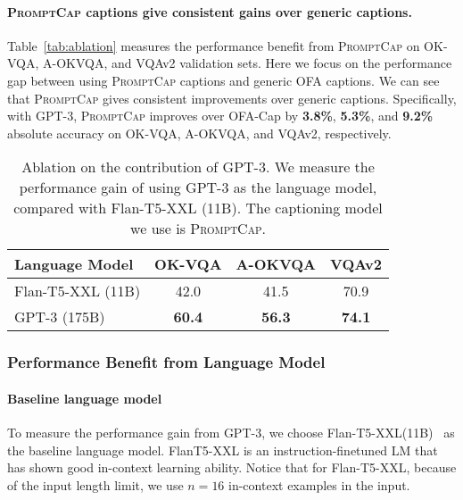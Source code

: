 \documentclass[10pt,twocolumn,letterpaper]{article}
\newcommand{\NAME}{\textsc{PromptCap}\xspace}
\begin{document}
\vspace{-0.1in}
\paragraph{\NAME captions give consistent gains over generic captions.}Table~\ref{tab:ablation} measures the performance benefit from \NAME on OK-VQA, A-OKVQA, and VQAv2 validation sets.
Here we focus on the performance gap between using \NAME captions and generic OFA captions.
We can see that \NAME gives consistent improvements over generic captions. 
Specifically, with GPT-3, \NAME improves over OFA-Cap by \textbf{3.8\%}, \textbf{5.3\%}, and \textbf{9.2\%} absolute accuracy on OK-VQA, A-OKVQA, and VQAv2, respectively.


\begin{table}[th]
\small
\centering
\caption{
Ablation on the contribution of GPT-3. We measure the performance gain of using GPT-3 as the language model, compared with Flan-T5-XXL (11B).
The captioning model we use is \NAME.
}
\begin{tabular}{l|ccc}
\toprule[1.2pt]
Language Model & OK-VQA & A-OKVQA & VQAv2 \\
\midrule
Flan-T5-XXL (11B) & 42.0 & 41.5 & 70.9\\
GPT-3 (175B) & \textbf{60.4} & \textbf{56.3} & \textbf{74.1} \\
\bottomrule[1.2pt]
\end{tabular}
\label{tab:ablation_gpt3}
\end{table} 

\vspace{-0.1in}
\subsubsection{Performance Benefit from Language Model}

\paragraph{Baseline language model} To measure the performance gain from GPT-3, we choose Flan-T5-XXL(11B)~\cite{Chung2022ScalingIL} as the baseline language model. FlanT5-XXL is an instruction-finetuned LM that has shown good in-context learning ability. Notice that for Flan-T5-XXL, because of the input length limit, we use $n=16$ in-context examples in the input.
\end{document}

